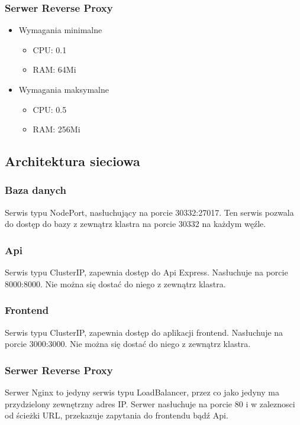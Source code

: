 \documentclass[12pt,a4paper]{article}
\begin{document}
\newpage

\subsubsection{Serwer Reverse Proxy}
\begin{itemize}
    \item Wymagania minimalne
    \begin{itemize}
        \item CPU: 0.1
        \item RAM: 64Mi
    \end{itemize}
    
    \item Wymagania maksymalne
    \begin{itemize}
        \item CPU: 0.5
        \item RAM: 256Mi
    \end{itemize}
\end{itemize}

\subsection{Architektura sieciowa}
\label{sec:ExampleResults}

\subsubsection{Baza danych}
Serwis typu NodePort, nasłuchujący na porcie 30332:27017. Ten serwis pozwala do dostęp do bazy z zewnątrz klastra na porcie 30332 na każdym węźle.

\subsubsection{Api}
Serwis typu ClusterIP, zapewnia dostęp do Api Express. Nasłuchuje na porcie 8000:8000. Nie można się dostać do niego z zewnątrz klastra.

\subsubsection{Frontend}
Serwis typu ClusterIP, zapewnia dostęp do aplikacji frontend. Nasłuchuje na porcie 3000:3000. Nie można się dostać do niego z zewnątrz klastra.

\subsubsection{Serwer Reverse Proxy}

Serwer Nginx to jedyny serwis typu LoadBalancer, przez co jako jedyny ma przydzielony zewnętrzny adres IP. Serwer nasłuchuje na porcie 80 i w zaleznosci od  ścieżki URL, przekazuje zapytania do frontendu bądź Api.

\newpage



\nocite{*}
\end{document}
